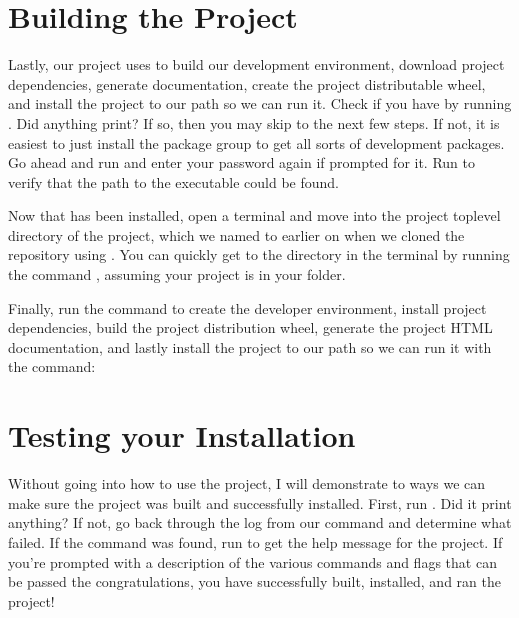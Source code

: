 \documentclass[letterpaper,10pt,english]{sphinxmanual}
\begin{document}
\chapter{Building the Project}
\label{\detokenize{newuser:building-the-project}}
Lastly, our project uses  to build our development environment, download
project dependencies, generate documentation, create the project distributable wheel, and install the project to our
path so we can run it. Check if you have  by running . Did anything print? If so, then
you may skip to the next few steps. If not, it is easiest to just install the  package group
to get all sorts of development packages. Go ahead and run  and enter your
password again if prompted for it. Run  to verify that the path to the  executable could
be found.

Now that  has been installed, open a terminal and move into the project top\sphinxhyphen{}level directory of the project,
which we named to  earlier on when we cloned the repository using . You can quickly get to the
directory in the terminal by running the command , assuming your project is in your
 folder.

Finally, run the command  to create the developer environment, install project dependencies, build the
project distribution wheel, generate the project HTML documentation, and lastly install the project to our path so we
can run it with the command: 


\chapter{Testing your Installation}
\label{\detokenize{newuser:testing-your-installation}}
Without going into how to use the project, I will demonstrate to ways we can make sure the project was built and
successfully installed. First, run . Did it print anything? If not, go back through the log from our
 command and determine what failed. If the command was found, run  to get the help
message for the project. If you’re prompted with a description of the various commands and flags that can be passed
the congratulations, you have successfully built, installed, and ran the project!
\end{document}
